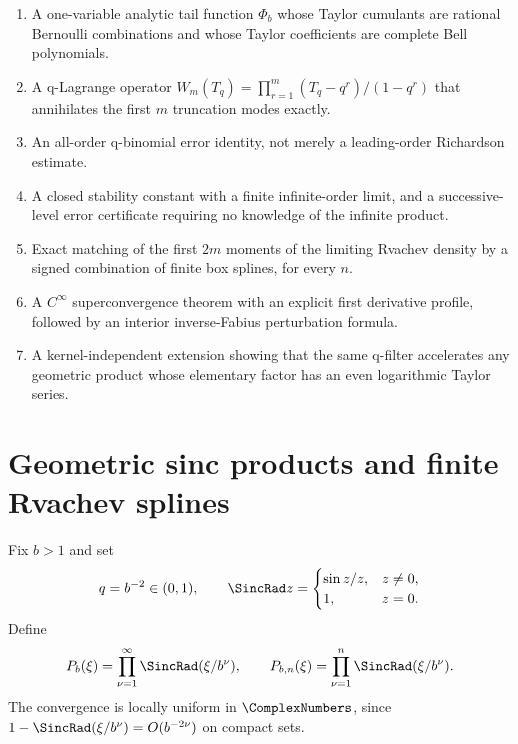 \documentclass[11pt,oneside]{article}
\numberwithin{equation}{section}
\theoremstyle{definition}
\theoremstyle{remark}
\begin{document}
\begin{enumerate}[label=\textbf{N\arabic*.},leftmargin=12mm]
\item A one-variable analytic tail function \(\Phi_b\) whose Taylor cumulants
are rational Bernoulli combinations and whose Taylor coefficients are complete
Bell polynomials.

\item A q-Lagrange operator
\(W_m(T_q)=\prod_{r=1}^m(T_q-q^r)/(1-q^r)\) that annihilates the first \(m\)
truncation modes exactly.

\item An all-order q-binomial error identity, not merely a leading-order
Richardson estimate.

\item A closed stability constant with a finite infinite-order limit, and a
successive-level error certificate requiring no knowledge of the infinite
product.

\item Exact matching of the first \(2m\) moments of the limiting Rvachev density
by a signed combination of finite box splines, for every \(n\).

\item A \(C^\infty\) superconvergence theorem with an explicit first derivative
profile, followed by an interior inverse-Fabius perturbation formula.

\item A kernel-independent extension showing that the same q-filter accelerates
any geometric product whose elementary factor has an even logarithmic Taylor
series.
\end{enumerate}

\section{Geometric sinc products and finite Rvachev splines}
\label{p2:sec:setup}

Fix \(b>1\) and set
\[
 q=b^{-2}\in(0,1),\qquad \SincRad z=\begin{cases}\sin z/z,&z\ne0,\\1,&z=0.\end{cases}
\]
Define
\begin{equation}
 P_b(\xi)=\prod_{\nu=1}^{\infty}\SincRad(\xi/b^\nu),
 \qquad
 P_{b,n}(\xi)=\prod_{\nu=1}^{n}\SincRad(\xi/b^\nu).
 \label{p2:eq:products}
\end{equation}
The convergence is locally uniform in \(\ComplexNumbers\), since
\(1-\SincRad(\xi/b^\nu)=O(b^{-2\nu})\) on compact sets.
\end{document}
